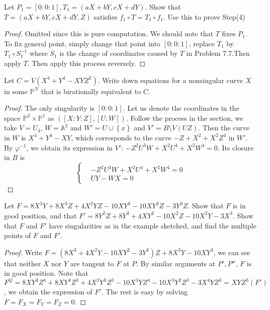 \documentclass{solution}
\begin{document}
\begin{problem}{7.8}
    Let $P_1 = [0:0:1], T_1 = (aX + bY, cX + dY)$. Show that $T = (aX + bY, cX + dY, Z)$ satisfies $f_1 \circ T = T_1 \circ f_1$. Use this to prove Step(4)
\end{problem}

\begin{proof}
    Omitted since this is pure computation. We should note that $T$ fixes $P_1$. To fix general point, simply change that point into $[0:0:1]$, replace $T_1$ by $T_1 \circ S_1 ^{-1}$ where $S_1$ is the change of coordinates caused by $T$ in Problem 7.7.Then apply $T$. Then apply this process reversely.
\end{proof}

\begin{problem}{7.9}
    Let $C = V(X^4 + Y^4 - XYZ^2)$. Write down equations for a nonsingular curve $X$ in some $\mathbb{P}^N$ that is birationally equivalent to $C$.
\end{problem}

\begin{proof}
    The only singularity is $[0:0:1]$. Let us denote the coordinates in the space $\mathbb{P}^2 \times \mathbb{P}^1$ as $([X:Y:Z], [U:W])$. Follow the process in the section, we take $V = U_3$, $W = \mathbb{A}^2$ and $W' = U \cup \left\lbrace x \right\rbrace$ and $V' = B \setminus V(UZ)$. Then the curve in $W$ is $X^4 + Y^4 - XY$, which corresponds to the curve $-Z + X^2 + X^2Z^4$ in $W'$. By $\varphi ^{-1}$, we obtain its expression in $V'$: $-Z^2U^3W + X^2U^4 + X^2W^4 = 0$. Its closure in $B$ is
    $$\left\{\begin{aligned}
        &-Z^2U^3W + X^2U^4 + X^2W^4 = 0\\
        &UY - WX = 0
    \end{aligned}\right.$$
    \TODO
\end{proof}

\begin{problem}{7.10}
    Let $F = 8X^3Y + 8X^3Z + 4X^2YZ - 10XY^3 - 10XY^2Z - 3Y^3Z$. Show that $F$ is in good position, and that $F' = 8Y^2Z + 8Y^3 + 4XY^2 - 10X^2Z - 10X^2Y - 3X^3$. Show that $F$ and $F'$ have singularities as in the example sketched, and find the multiple points of $F$ and $F'$.
\end{problem}

\begin{proof}
    Write $F = (8X^3 + 4X^2Y - 10 XY^2 - 3Y^3)Z + 8X^3Y - 10 XY^3$, we can see that neither $X$ nor $Y$ are tangent to $F$ at $P$. By similar arguments at $P', P''$, $F$ is in good position. Note that $F^Q = 8XY^3Z^4 + 8XY^4Z^3 + 4 X^2Y^3Z^3 - 10 X^3YZ^4 - 10 X^3Y^2Z^3 - 3X^4YZ^3 = XYZ^3(F')$, we obtain the expression of $F'$. The rest is easy by solving $F = F_X = F_Y = F_Z = 0$.
\end{proof}
\end{document}
